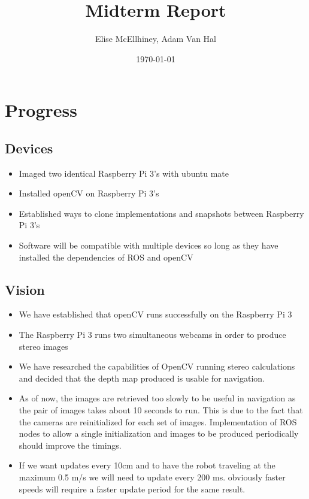 \documentclass[11pt]{amsart}
\title{Midterm Report}
\author{Elise McEllhiney, Adam Van Hal}
\date{\today}                                           %
\begin{document}
\maketitle

\section{Progress}
\subsection{Devices}
\begin{itemize}
\item Imaged two identical Raspberry Pi 3's with ubuntu mate
\item Installed openCV on Raspberry Pi 3's
\item Established ways to clone implementations and snapshots between Raspberry Pi 3's
\item Software will be compatible with multiple devices so long as they have installed the dependencies of ROS and openCV
\end{itemize}

\subsection{Vision}
\begin{itemize}
\item We have established that openCV runs successfully on the Raspberry Pi 3
\item The Raspberry Pi 3 runs two simultaneous webcams in order to produce stereo images
\item We have researched the capabilities of OpenCV running stereo calculations and decided that the depth map produced is usable for navigation. 
\item As of now, the images are retrieved too slowly to be useful in navigation as the pair of images takes about 10 seconds to run.  This is due to the fact that the cameras are reinitialized for each set of images.  Implementation of ROS nodes to allow a single initialization and images to be produced periodically should improve the timings.
\item If we want updates every 10cm and to have the robot traveling at the maximum 0.5 m/s we will need to update every 200 ms. obviously faster speeds will require a faster update period for the same result.
\end{itemize}
\end{document}
